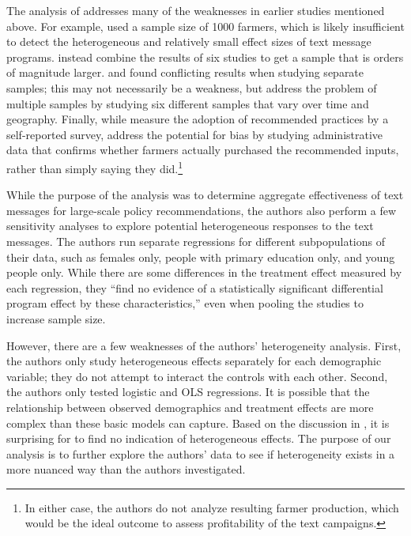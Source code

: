 \documentclass[12pt]{article}
\begin{document}
The analysis of \textcite{fabregas_digital_2025} addresses many of the weaknesses in earlier studies mentioned above. For example, \textcite{fafchamps_impact_2012} used a sample size of 1000 farmers, which is likely insufficient to detect the heterogeneous and relatively small effect sizes of text message programs. \textcite{fabregas_digital_2025} instead combine the results of six studies to get a sample that is orders of magnitude larger. \textcite{casaburi_harnessing_2019} and \textcite{casaburi_management_2016} found conflicting results when studying separate samples; this may not necessarily be a weakness, but \textcite{fabregas_digital_2025} address the problem of multiple samples by studying six different samples that vary over time and geography. Finally, while \textcite{carrion-yaguana_promoting_2020} measure the adoption of recommended practices by a self-reported survey, \textcite{fabregas_digital_2025} address the potential for bias by studying administrative data that confirms whether farmers actually purchased the recommended inputs, rather than simply saying they did.\footnote{In either case, the authors do not analyze resulting farmer production, which would be the ideal outcome to assess profitability of the text campaigns.}

While the purpose of the \textcite{fabregas_digital_2025} analysis was to determine aggregate effectiveness of text messages for large-scale policy recommendations, the authors also perform a few sensitivity analyses to explore potential heterogeneous responses to the text messages. The authors run separate regressions for different subpopulations of their data, such as females only, people with primary education only, and young people only. While there are some differences in the treatment effect measured by each regression, they ``find no evidence of a statistically significant differential program effect by these characteristics,'' even when pooling the studies to increase sample size. 

However, there are a few weaknesses of the authors' heterogeneity analysis. First, the authors only study heterogeneous effects separately for each demographic variable; they do not attempt to interact the controls with each other. Second, the authors only tested logistic and OLS regressions. It is possible that the relationship between observed demographics and treatment effects are more complex than these basic models can capture. Based on the discussion in \textcite{aker_promise_2016}, it is surprising for \textcite{fabregas_digital_2025} to find no indication of heterogeneous effects. The purpose of our analysis is to further explore the authors' data to see if heterogeneity exists in a more nuanced way than the authors investigated.
\end{document}
